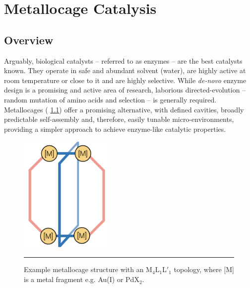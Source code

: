 \documentclass[../../main.tex]{subfiles}
\begin{document}
\setcounter{footnote}{0} 
\newcommand{\rom}[1]{\uppercase\expandafter{\romannumeral #1\relax}}


\chapter{Metallocage Catalysis}

\section{Overview}

Arguably, biological catalysts -- referred to as enzymes -- are the best catalysts known. They operate in safe and abundant solvent (water), are highly active at room temperature or close to it and are highly selective. While \emph{de-novo} enzyme design is a promising and active area of research, laborious directed-evolution -- random mutation of amino acids and selection -- is generally required.\cite{Vller2020} Metallocages (\figurename{ \ref{fig::cage_overview_1}}) offer a promising alternative, with defined cavities, broadly predictable self-assembly and, therefore, easily tunable micro-environments, providing a simpler approach to achieve enzyme-like catalytic properties.\cite{Sepehrpour2019}

\begin{figure}[h!]
	\vspace{0.4cm}
	\centering
	\includegraphics[width=4.5cm]{3/overview/figs/fig1/fig1}
	\vspace{0.3cm}
	\hrule
	\caption{Example metallocage structure with an M$_4$L$_1$L$'_1$ topology, where [M] is a metal fragment e.g. Au(I) or PdX$_2$.}
	\label{fig::cage_overview_1}
\end{figure}
\end{document}
